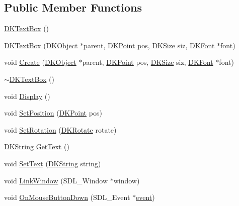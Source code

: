 \subsection*{Public Member Functions}
\begin{DoxyCompactItemize}
\item 
\hyperlink{class_d_k_text_box_a68a16143f5c12918a73bf4e4fda11fee}{D\-K\-Text\-Box} ()
\item 
\hyperlink{class_d_k_text_box_a3dc0767682907958b0021bba1f34765a}{D\-K\-Text\-Box} (\hyperlink{class_d_k_object}{D\-K\-Object} $\ast$parent, \hyperlink{_d_k_axis_8h_a0ca1f005fbb936f8e7a7f2433591f418}{D\-K\-Point} pos, \hyperlink{_d_k_axis_8h_aaa25a8c7cbf504fffdb8a4208ff7a731}{D\-K\-Size} siz, \hyperlink{class_d_k_font}{D\-K\-Font} $\ast$font)
\item 
void \hyperlink{class_d_k_text_box_a2849f32f411b650a8fc8861dd6231865}{Create} (\hyperlink{class_d_k_object}{D\-K\-Object} $\ast$parent, \hyperlink{_d_k_axis_8h_a0ca1f005fbb936f8e7a7f2433591f418}{D\-K\-Point} pos, \hyperlink{_d_k_axis_8h_aaa25a8c7cbf504fffdb8a4208ff7a731}{D\-K\-Size} siz, \hyperlink{class_d_k_font}{D\-K\-Font} $\ast$font)
\item 
\hyperlink{class_d_k_text_box_a311d4311e255e3440cb86885f3571e33}{$\sim$\-D\-K\-Text\-Box} ()
\item 
void \hyperlink{class_d_k_text_box_a0bfda3ed793f1d4f8d2fa60e66a9c6d0}{Display} ()
\item 
void \hyperlink{class_d_k_text_box_ac32903f04b4a228d1225bc249458bdeb}{Set\-Position} (\hyperlink{_d_k_axis_8h_a0ca1f005fbb936f8e7a7f2433591f418}{D\-K\-Point} pos)
\item 
void \hyperlink{class_d_k_text_box_af1c70827e62de6136f60ea47aea1ec5f}{Set\-Rotation} (\hyperlink{_d_k_axis_8h_a886498401ce03ee3a95cb58785ab475a}{D\-K\-Rotate} rotate)
\item 
\hyperlink{_d_k_string_8h_ac168e8555ceba18e1a2919b21976bc84}{D\-K\-String} \hyperlink{class_d_k_text_box_a7d163fae6c31d3ca2597336ef96c32ff}{Get\-Text} ()
\item 
void \hyperlink{class_d_k_text_box_abe36c26b4e79831fa6136567d627043d}{Set\-Text} (\hyperlink{_d_k_string_8h_ac168e8555ceba18e1a2919b21976bc84}{D\-K\-String} string)
\item 
void \hyperlink{class_d_k_text_box_ae0113d83289569c6639cecc70ef95caf}{Link\-Window} (S\-D\-L\-\_\-\-Window $\ast$window)
\item 
void \hyperlink{class_d_k_text_box_a24e75778e4ace3ea7b360a5c9639f529}{On\-Mouse\-Button\-Down} (S\-D\-L\-\_\-\-Event $\ast$\hyperlink{class_d_k_event_a3deebb932ed734363c4ece87971bc45f}{event})

\end{DoxyCompactItemize}
